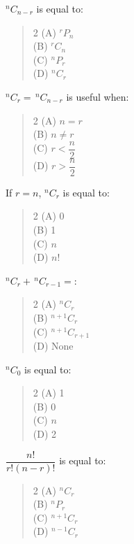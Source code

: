 \documentclass[11pt,a4paper]{article}
\begin{document}
\begin{mcqlist}
\item $^nC_{n-r}$ is equal to:
\begin{quote}\begin{multicols}{2}
\noindent (A) $^rP_n$ \\
(B) $^rC_n$ \\
(C) $^nP_r$ \\
(D) $^nC_r$
\end{multicols}\end{quote}

\item $^nC_r=\,^nC_{n-r}$ is useful when:
\begin{quote}\begin{multicols}{2}
\noindent (A) $n=r$ \\
(B) $n\neq r$ \\
(C) $r<\dfrac{n}{2}$ \\
(D) $r>\dfrac{n}{2}$
\end{multicols}\end{quote}

\item If $r=n$, $^nC_r$ is equal to:
\begin{quote}\begin{multicols}{2}
\noindent (A) 0 \\
(B) 1 \\
(C) $n$ \\
(D) $n!$
\end{multicols}\end{quote}

\item $^nC_r+\,^nC_{r-1}=$:
\begin{quote}\begin{multicols}{2}
\noindent (A) $^nC_r$ \\
(B) $^{n+1}C_r$ \\
(C) $^{n+1}C_{r+1}$ \\
(D) None
\end{multicols}\end{quote}

\item $^nC_0$ is equal to:
\begin{quote}\begin{multicols}{2}
\noindent (A) 1 \\
(B) 0 \\
(C) $n$ \\
(D) 2
\end{multicols}\end{quote}

\item $\dfrac{n!}{r!(n-r)!}$ is equal to:
\begin{quote}\begin{multicols}{2}
\noindent (A) $^nC_r$ \\
(B) $^nP_r$ \\
(C) $^{n+1}C_r$ \\
(D) $^{n-1}C_r$
\end{multicols}\end{quote}


\end{mcqlist}
\end{document}
